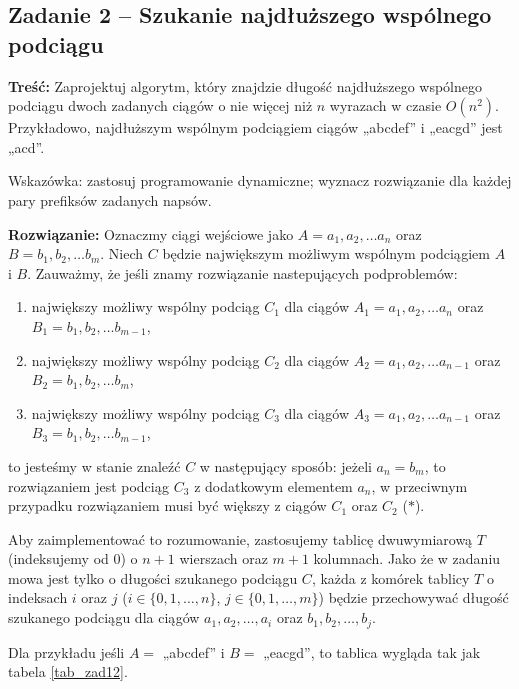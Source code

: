 \subsection{Zadanie 2 -- Szukanie najdłuższego wspólnego podciągu}
\textbf{Treść:} Zaprojektuj algorytm, który znajdzie długość najdłuższego wspólnego podciągu dwoch zadanych ciągów
o nie więcej niż $n$ wyrazach w czasie $O(n^2)$. Przykładowo, najdłuższym wspólnym podciągiem 
ciągów „abcdef” i „eacgd” jest „acd”.

Wskazówka: zastosuj programowanie dynamiczne; wyznacz rozwiązanie dla każdej pary prefiksów zadanych napsów.

\textbf{Rozwiązanie:}
Oznaczmy ciągi wejściowe jako 
$A = a_1, a_2, \dots a_n$ oraz 
$B = b_1, b_2, \dots b_m$. Niech $C$ będzie największym możliwym
wspólnym podciągiem $A$ i $B$.  Zauważmy, że jeśli znamy rozwiązanie
nastepujących podproblemów:
\begin{enumerate}
	\item największy możliwy wspólny podciąg $C_1$ dla ciągów $A_1=a_1, a_2, \dots a_n$ oraz 
	$B_1=b_1, b_2, \dots b_{m-1}$,
	\item największy możliwy wspólny podciąg $C_2$ dla ciągów $A_2 =a_1, a_2, \dots a_{n-1}$ oraz 
	$B_2=b_1, b_2, \dots b_{m}$,
	\item największy możliwy wspólny podciąg $C_3$ dla ciągów $A_3=a_1, a_2, \dots a_{n-1}$ oraz 
	$B_3=b_1, b_2, \dots b_{m-1}$,
\end{enumerate}
to jesteśmy w stanie znaleźć $C$
w następujący sposób: jeżeli $a_n = b_m$, to rozwiązaniem 
jest podciąg $C_3$ z dodatkowym elementem $a_n$, w przeciwnym przypadku
rozwiązaniem musi być większy z ciągów $C_1$ oraz $C_2$ ($\ast$). 

Aby zaimplementować to rozumowanie, zastosujemy tablicę dwuwymiarową $T$ 
(indeksujemy od 0)
o $n+1$ wierszach oraz $m+1$ kolumnach. Jako że w zadaniu mowa jest 
tylko o długości szukanego podciągu $C$, każda z komórek tablicy $T$ 
o indeksach $i$ oraz $j$ ($i \in \{0,1, \dots, n\}$, 
$j \in \{0,1, \dots, m\}$) będzie 
przechowywać długość szukanego podciągu dla ciągów 
$a_1, a_2, \dots, a_i$ oraz $b_1, b_2, \dots, b_j$. 

Dla przykładu 
jeśli $A = $ „abcdef” i  $B = $ „eacgd”, to tablica 
wygląda tak jak tabela \ref{tab_zad12}.


